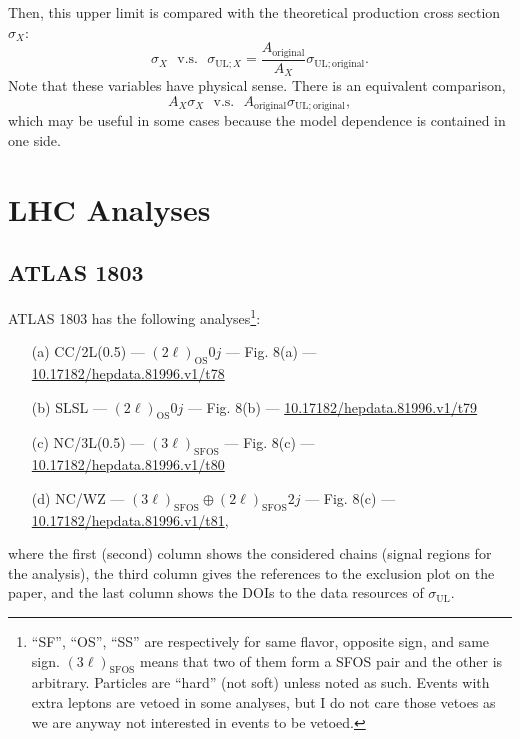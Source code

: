 \documentclass[a4paper,10pt,captions=tableheading,DIV=14]{scrartcl}
\numberwithin{equation}{section}
\newcommand\w[1]{_{\mathrm{#1}}}
\begin{document}
Then, this upper limit is compared with the theoretical production cross section $\sigma_X$:
\begin{equation}
 \sigma_X \text{~~v.s.~~} \sigma_{\mathrm{UL};X}=\frac{A\w{original}}{A_X}\sigma\w{UL;original}.
\end{equation}
Note that these variables have physical sense.
There is an equivalent comparison,
\begin{equation}
 A_X \sigma_X \text{~~v.s.~~} A\w{original}\sigma\w{UL;original},
\end{equation}
which may be useful in some cases because the model dependence is contained in one side.




\section{LHC Analyses}
\subsection{ATLAS 1803}
ATLAS 1803\cite{1803.02762} has the following analyses\footnote{``SF'', ``OS'', ``SS'' are respectively for same flavor, opposite sign, and same sign. $(3\ell)\w{SFOS}$ means that two of them form a SFOS pair and the other is arbitrary. Particles are ``hard'' (not soft) unless noted as such. Events with extra leptons are vetoed in some analyses, but I do not care those vetoes as we are anyway not interested in events to be vetoed.}:
\begin{itemize}
 \item[(a)] CC/2L(0.5) --- $(2\ell)\w{OS}0j$ --- Fig. 8(a) --- \url{10.17182/hepdata.81996.v1/t78}
 \item[(b)] SLSL       --- $(2\ell)\w{OS}0j$ --- Fig. 8(b) --- \url{10.17182/hepdata.81996.v1/t79}
 \item[(c)] NC/3L(0.5) --- $(3\ell)\w{SFOS}$  --- Fig. 8(c) --- \url{10.17182/hepdata.81996.v1/t80}
 \item[(d)] NC/WZ      --- $(3\ell)\w{SFOS}\oplus(2\ell)\w{SFOS}2j$  --- Fig. 8(c) --- \url{10.17182/hepdata.81996.v1/t81},
\end{itemize}
where the first (second) column shows the considered chains (signal regions for the analysis), the third column gives the references to the exclusion plot on the paper, and the last column shows the DOIs to the data resources of $\sigma\w{UL}$.
\end{document}

